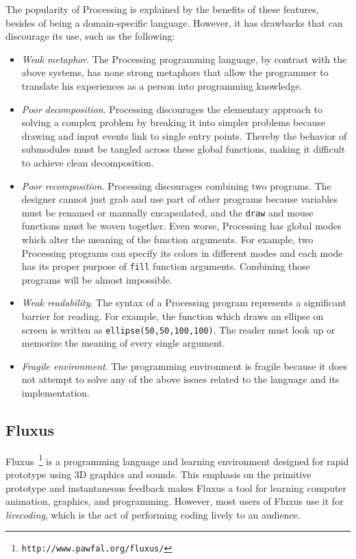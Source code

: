 The popularity of Processing is explained by the benefits of these features, besides of being a domain-specific language. However, it has drawbacks that can discourage its use, such as the following:

\begin{itemize}
  \item \textit{Weak metaphor}. The Processing programming language, by contrast with the above systems, has none strong metaphors that allow the programmer to translate his experiences as a person into programming knowledge. 

  \item \textit{Poor decomposition}. Processing discourages the elementary approach to solving a complex problem by breaking it into simpler problems because drawing and input events link to single entry points. Thereby the behavior of submodules must be tangled across these global functions, making it difficult to achieve clean decomposition.

  \item \textit{Poor recomposition}. Processing discourages combining two programs. The designer cannot just grab and use part of other programs because variables must be renamed or manually encapsulated, and the \texttt{draw} and mouse functions must be woven together. Even worse, Processing has global modes which alter the meaning of the function arguments. For example, two Processing programs can specify its colors in different modes and each mode has its proper purpose of \texttt{fill} function arguments. Combining those programs will be almost impossible. 

  \item \textit{Weak readability}. The syntax of a Processing program represents a significant barrier for reading. For example, the function which draws an ellipse on screen is written as \texttt{ellipse(50,50,100,100)}. The reader must look up or memorize the meaning of every single argument.

  \item \textit{Fragile environment}. The programming environment is fragile because it does not attempt to solve any of the above issues related to the language and its implementation.
\end{itemize}

\subsection{Fluxus}
\label{subsec:fluxus}
Fluxus~\citep{griffiths2007fluxus}\footnote{\texttt{http://www.pawfal.org/fluxus/}} is a programming language and learning environment designed for rapid prototype using 3D graphics and sounds. This emphasis on the primitive prototype and instantaneous feedback makes Fluxus a tool for learning computer animation, graphics, and programming. However, most users of Fluxus use it for \textit{livecoding}, which is the act of performing coding lively to an audience.

